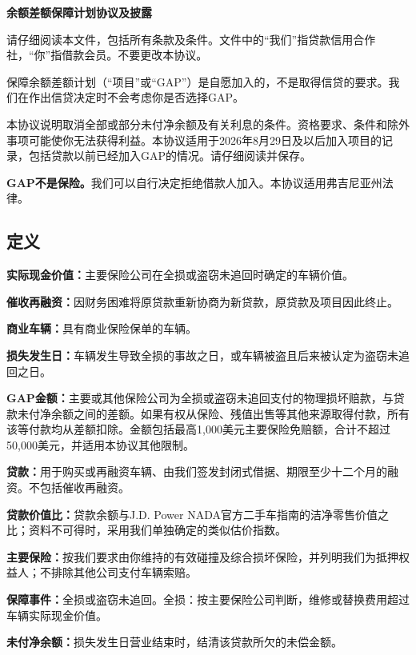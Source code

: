 \documentclass[UTF8,fontset=none,11pt,a4paper]{ctexart}
\begin{document}
{\noindent\fontsize{20}{25}\selectfont\bfseries 余额差额保障计划协议及披露\par}
\vspace{10pt}
请仔细阅读本文件，包括所有条款及条件。文件中的“我们”指贷款信用合作社，“你”指借款会员。不要更改本协议。


保障余额差额计划（“项目”或“GAP”）是自愿加入的，不是取得信贷的要求。我们在作出信贷决定时不会考虑你是否选择GAP。


本协议说明取消全部或部分未付净余额及有关利息的条件。资格要求、条件和除外事项可能使你无法获得利益。本协议适用于2026年8月29日及以后加入项目的记录，包括贷款以前已经加入GAP的情况。请仔细阅读并保存。


\textbf{GAP不是保险。}我们可以自行决定拒绝借款人加入。本协议适用弗吉尼亚州法律。


\subsection*{定义}
\textbf{实际现金价值：}主要保险公司在全损或盗窃未追回时确定的车辆价值。


\textbf{催收再融资：}因财务困难将原贷款重新协商为新贷款，原贷款及项目因此终止。


\textbf{商业车辆：}具有商业保险保单的车辆。


\textbf{损失发生日：}车辆发生导致全损的事故之日，或车辆被盗且后来被认定为盗窃未追回之日。


\textbf{GAP金额：}主要或其他保险公司为全损或盗窃未追回支付的物理损坏赔款，与贷款未付净余额之间的差额。如果有权从保险、残值出售等其他来源取得付款，所有该等付款均从差额扣除。金额包括最高1,000美元主要保险免赔额，合计不超过50,000美元，并适用本协议其他限制。


\textbf{贷款：}用于购买或再融资车辆、由我们签发封闭式借据、期限至少十二个月的融资。不包括催收再融资。


\textbf{贷款价值比：}贷款余额与J.D. Power NADA官方二手车指南的洁净零售价值之比；资料不可得时，采用我们单独确定的类似估价指数。


\textbf{主要保险：}按我们要求由你维持的有效碰撞及综合损坏保险，并列明我们为抵押权益人；不排除其他公司支付车辆索赔。


\textbf{保障事件：}全损或盗窃未追回。全损：按主要保险公司判断，维修或替换费用超过车辆实际现金价值。


\textbf{未付净余额：}损失发生日营业结束时，结清该贷款所欠的未偿金额。
\end{document}

